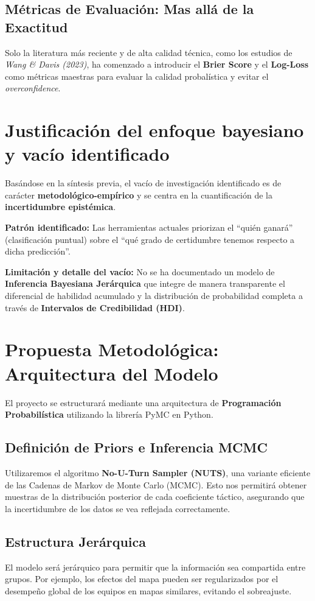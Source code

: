 \documentclass[12pt,a4paper]{article}
\begin{document}
\subsection{Métricas de Evaluación: Mas allá de la Exactitud}
Solo la literatura más reciente y de alta calidad técnica, como los estudios de \textit{Wang \& Davis (2023)}, ha comenzado a introducir el \textbf{Brier Score} y el \textbf{Log-Loss} como métricas maestras para evaluar la calidad probalística y evitar el \textit{overconfidence}.

\section{Justificación del enfoque bayesiano y vacío identificado}

Basándose en la síntesis previa, el vacío de investigación identificado es de carácter \textbf{metodológico-empírico} y se centra en la cuantificación de la \textbf{incertidumbre epistémica}.

\textbf{Patrón identificado:} Las herramientas actuales priorizan el ``quién ganará'' (clasificación puntual) sobre el ``qué grado de certidumbre tenemos respecto a dicha predicción''.

\textbf{Limitación y detalle del vacío:} No se ha documentado un modelo de \textbf{Inferencia Bayesiana Jerárquica} que integre de manera transparente el diferencial de habilidad acumulado y la distribución de probabilidad completa a través de \textbf{Intervalos de Credibilidad (HDI)}.

\section{Propuesta Metodológica: Arquitectura del Modelo}

El proyecto se estructurará mediante una arquitectura de \textbf{Programación Probabilística} utilizando la librería PyMC en Python.

\subsection{Definición de Priors e Inferencia MCMC}
Utilizaremos el algoritmo \textbf{No-U-Turn Sampler (NUTS)}, una variante eficiente de las Cadenas de Markov de Monte Carlo (MCMC). Esto nos permitirá obtener muestras de la distribución posterior de cada coeficiente táctico, asegurando que la incertidumbre de los datos se vea reflejada correctamente.

\subsection{Estructura Jerárquica}
El modelo será jerárquico para permitir que la información sea compartida entre grupos. Por ejemplo, los efectos del mapa pueden ser regularizados por el desempeño global de los equipos en mapas similares, evitando el sobreajuste.
\end{document}
